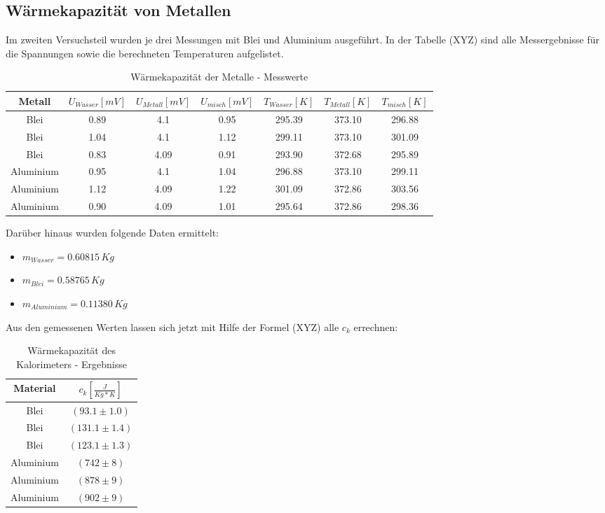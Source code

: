 \documentclass[11pt,ngerman,a4paper]{article}
\begin{document}
\subsection{Wärmekapazität von Metallen}
Im zweiten Versuchsteil wurden je drei Messungen mit Blei und Aluminium ausgeführt. In der Tabelle (XYZ) sind alle Messergebnisse für die Spannungen sowie die berechneten Temperaturen aufgelistet.
\begin{table}[H]
\centering
\begin{tabular}{|c|c|c|c|c|c|c|}
\hline
Metall & $U_{Wasser}[mV]$ &$U_{Metall}[mV]$ &$U_{misch}[mV]$ & $T_{Wasser}[K]$ & $T_{Metall}[K]$ & $T_{misch}[K]$ \\
\hline
Blei & 0.89 & 4.1 & 0.95 & 295.39 & 373.10 & 296.88\\
Blei & 1.04 & 4.1 & 1.12 & 299.11 & 373.10 & 301.09\\
Blei & 0.83 & 4.09 & 0.91 & 293.90 & 372.68 & 295.89\\
Aluminium & 0.95 & 4.1 & 1.04 & 296.88 & 373.10 & 299.11\\
Aluminium & 1.12 & 4.09 & 1.22 & 301.09 & 372.86 & 303.56\\
Aluminium & 0.90 & 4.09 & 1.01 & 295.64 & 372.86 & 298.36\\
\hline
\end{tabular}
\caption{Wärmekapazität der Metalle - Messwerte}
\end{table}
\noindent
Darüber hinaus wurden folgende Daten ermittelt:
\begin{itemize}
\item $m_{Wasser} = 0.60815 \,Kg$
\item $m_{Blei} = 0.58765 \, Kg$
\item $m_{Aluminium} = 0.11380 \, Kg$
\end{itemize}
Aus den gemessenen Werten lassen sich jetzt mit Hilfe der Formel (XYZ) alle $c_k$ errechnen:
\begin{table}[H]
\centering
\begin{tabular}{|c|c|}
\hline
Material & $c_k [\frac{J}{Kg*K}]$ \\
\hline
Blei & $(93.1 \pm 1.0)$ \\
Blei & $(131.1\pm1.4)$ \\
Blei & $(123.1\pm1.3)$\\
Aluminium & $(742\pm8)$ \\
Aluminium & $(878\pm9)$\\
Aluminium & $(902\pm9)$\\
\hline
\end{tabular}
\caption{Wärmekapazität des Kalorimeters - Ergebnisse}
\end{table}
\end{document}

